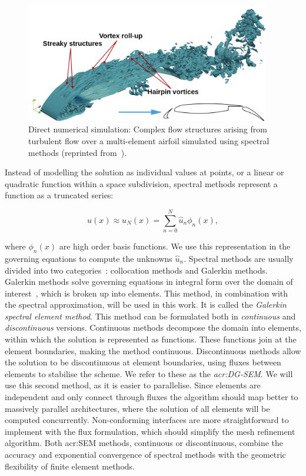 \begin{figure}[H]
    \centering
    \includegraphics[width=0.95\textwidth]{Chapter_introduction/media/spectral_element_method}
    \caption{Direct numerical simulation: Complex flow structures arising from turbulent flow over a multi-element airfoil simulated using spectral methods (reprinted from~\cite{Vadsola2021}).}\label{fig:intro_sem}
\end{figure}

Instead of modelling the solution as individual values at points, or a linear or quadratic function
within a space subdivision, spectral methods represent a function as a truncated series:

\begin{equation}
    u(x) \approx u_N(x) = \sum_{n = 0}^{N} \widehat{u}_n \phi _n(x),
\end{equation}

\noindent
where \(\phi _n(x)\) are high order basis functions. We use this representation in the governing
equations to compute the unknowns \(\widehat{u}_n\). Spectral methods are usually divided into two
categories~\cite{Karniadakis2005}: collocation methods and Galerkin methods. Galerkin methods solve
governing equations in integral form over the domain of interest~\cite{Reed1973}, which is broken up
into elements. This method, in combination with the spectral approximation, will be used in this
work. It is called the \textit{Galerkin spectral element method}. This method can be formulated both
in \textit{continuous} and \textit{discontinuous} versions. Continuous methods decompose the domain
into elements, within which the solution is represented as functions. These functions join at the
element boundaries, making the method continuous. Discontinuous methods allow the solution to be
discontinuous at element boundaries, using fluxes between elements to stabilise the scheme. We refer
to these as the \textit{\acrfull{acr:DG-SEM}}. We will use this second method, as it is easier to
parallelise. Since elements are independent and only connect through fluxes the algorithm should map
better to massively parallel architectures, where the solution of all elements will be computed
concurrently. Non-conforming interfaces are more straightforward to implement with the flux
formulation, which should simplify the mesh refinement algorithm. Both \acrshort{acr:SEM} methods,
continuous or discontinuous, combine the accuracy and exponential convergence of spectral methods
with the geometric flexibility of finite element methods. 

